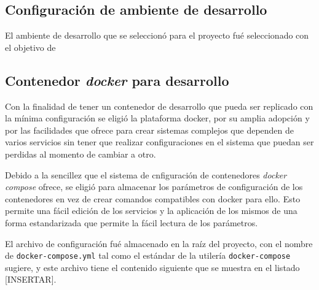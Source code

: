 \subsection{Configuración de ambiente de
desarrollo}\label{configuraciuxf3n-de-ambiente-de-desarrollo}

El ambiente de desarrollo que se seleccionó para el proyecto fué
seleccionado con el objetivo de

\subsection{\texorpdfstring{Contenedor \emph{docker} para
desarrollo}{Contenedor docker para desarrollo}}\label{contenedor-docker-para-desarrollo}

Con la finalidad de tener un contenedor de desarrollo que pueda ser
replicado con la mínima configuración se eligió la plataforma docker,
por su amplia adopción y por las facilidades que ofrece para crear
sistemas complejos que dependen de varios servicios sin tener que
realizar configuraciones en el sistema que puedan ser perdidas al
momento de cambiar a otro.

Debido a la sencillez que el sistema de cnfiguración de contenedores
\emph{docker compose} ofrece, se eligió para almacenar los parámetros de
configuración de los contenedores en vez de crear comandos compatibles
con docker para ello. Esto permite una fácil edición de los servicios y
la aplicación de los mismos de una forma estandarizada que permite la
fácil lectura de los parámetros.

El archivo de configuración fué almacenado en la raíz del proyecto, con
el nombre de \texttt{docker-compose.yml} tal como el estándar de la
utilería \texttt{docker-compose} sugiere, y este archivo tiene el
contenido siguiente que se muestra en el listado {[}INSERTAR{]}.

